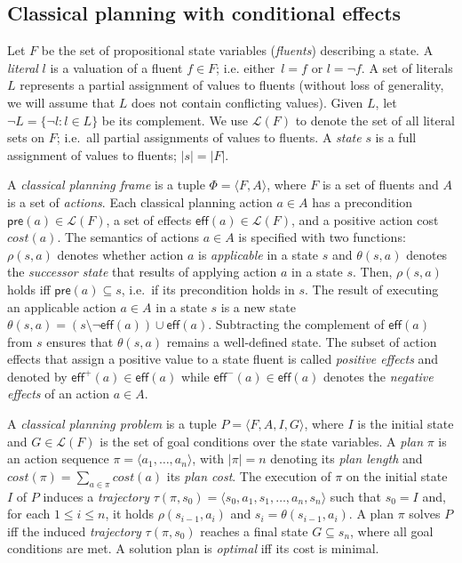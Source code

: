 \documentclass{article}
\newcommand{\tup}[1]{{\langle #1 \rangle}}
\newcommand{\pre}{\mathsf{pre}}     %
\newcommand{\eff}{\mathsf{eff}}     %
\begin{document}
\subsection{Classical planning with conditional effects}
Let $F$ be the set of  propositional state variables ({\em fluents}) describing a state. A {\em literal} $l$ is a valuation of a fluent $f\in F$; i.e. either~$l=f$ or $l=\neg f$. A set of literals $L$ represents a partial assignment of values to fluents (without loss of generality, we will assume that $L$ does not contain conflicting values). Given $L$, let $\neg L=\{\neg l:l\in L\}$ be its complement. We use $\mathcal{L}(F)$ to denote the set of all literal sets on $F$; i.e.~all partial assignments of values to fluents. A {\em state} $s$ is a full assignment of values to fluents; $|s|=|F|$.

A {\em classical planning frame} is a tuple $\Phi=\tup{F,A}$, where $F$ is a set of fluents and $A$ is a set of \emph{actions}. Each classical planning action $a\in A$ has a precondition $\pre(a)\in\mathcal{L}(F)$, a set of effects $\eff(a)\in\mathcal{L}(F)$, and a positive action cost $cost(a)$. The semantics of actions $a\in A$ is specified with two functions: $\rho(s,a)$ denotes whether action $a$ is {\em applicable} in a state $s$ and $\theta(s,a)$ denotes the {\em successor state} that results of applying action $a$ in a state $s$. Then, $\rho(s,a)$ holds iff $\pre(a)\subseteq s$, i.e.~if its precondition holds in $s$. The result of executing an applicable action $a\in A$ in a state $s$ is a new state $\theta(s,a)=(s\setminus \neg\eff(a))\cup\eff(a)$. Subtracting the complement of $\eff(a)$ from $s$ ensures that $\theta(s,a)$ remains a well-defined state. The subset of action effects that assign a positive value to a state fluent is called {\em positive effects} and denoted by $\eff^+(a)\in \eff(a)$ while $\eff^-(a)\in \eff(a)$ denotes the {\em negative effects} of an action $a\in A$.

A {\em classical planning problem} is a tuple $P=\tup{F,A,I,G}$, where $I$ is the initial state and $G\in\mathcal{L}(F)$ is the set of goal conditions over the state variables. A {\em plan} $\pi$ is an action sequence $\pi=\tup{a_1, \ldots, a_n}$, with $|\pi|=n$ denoting its {\em plan length} and $cost(\pi)=\sum_{a\in\pi} cost(a)$ its {\em plan cost}. The execution of $\pi$ on the initial state $I$ of $P$ induces a {\em trajectory} $\tau(\pi,s_0)=\tup{s_0, a_1, s_1, \ldots, a_n, s_n}$ such that $s_0=I$ and, for each {\small $1\leq i\leq n$}, it holds $\rho(s_{i-1},a_i)$ and $s_i=\theta(s_{i-1},a_i)$. A plan $\pi$ solves $P$ iff the induced {\em trajectory} $\tau(\pi,s_0)$ reaches a final state $G \subseteq s_n$, where all goal conditions are met. A solution plan is {\em optimal} iff its cost is minimal.
\end{document}
